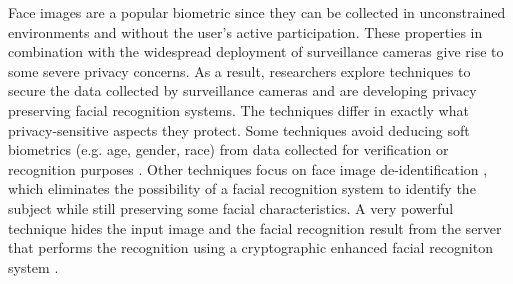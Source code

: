 \documentclass[letterpaper]{article} %
\begin{document}
Face images are a popular biometric since they can be collected in unconstrained environments and without the user's active participation. These properties in combination with the widespread deployment of surveillance cameras give rise to some severe privacy concerns.  As a result, researchers explore techniques to secure the data collected by surveillance cameras and are developing privacy preserving facial recognition systems. The techniques differ in exactly what privacy-sensitive aspects they protect. Some techniques avoid deducing soft biometrics (e.g. age, gender, race) from data collected for verification or recognition purposes \cite{mirjalili2018gender, mirjalili2020privacynet}. Other techniques focus on face image de-identification \cite{newton2005preserving}, which eliminates the possibility of a facial recognition system to identify the subject while still preserving some facial characteristics. A very powerful technique hides the input image and the facial recognition result from the server that performs the recognition using a cryptographic enhanced facial recogniton system \cite{erkin2009privacy}.
\\
\newline
\end{document}
